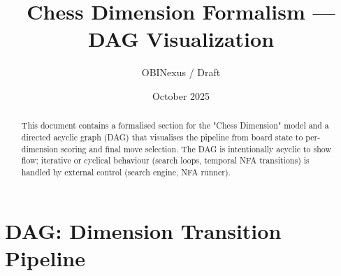 \documentclass[12pt,a4paper]{article}
\title{Chess Dimension Formalism — DAG Visualization}
\author{OBINexus / Draft}
\date{October 2025}
\begin{document}
\maketitle

\begin{abstract}
This document contains a formalised section for the "Chess Dimension" model and a directed acyclic graph (DAG) that visualises the pipeline from board state to per-dimension scoring and final move selection. The DAG is intentionally acyclic to show flow; iterative or cyclical behaviour (search loops, temporal NFA transitions) is handled by external control (search engine, NFA runner).
\end{abstract}

\section{DAG: Dimension Transition Pipeline}
\end{document}
